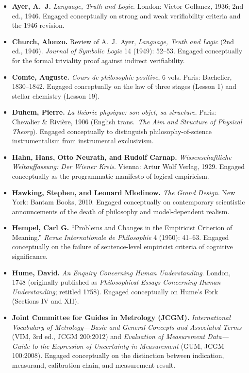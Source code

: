 \begin{itemize}
\item \textbf{Ayer, A.\ J.} \emph{Language, Truth and Logic}. London: Victor Gollancz, 1936; 2nd ed., 1946. Engaged conceptually on strong and weak verifiability criteria and the 1946 revision.
\item \textbf{Church, Alonzo.} Review of A.\ J.\ Ayer, \emph{Language, Truth and Logic} (2nd ed., 1946). \emph{Journal of Symbolic Logic} 14 (1949): 52--53. Engaged conceptually for the formal triviality proof against indirect verifiability.
\item \textbf{Comte, Auguste.} \emph{Cours de philosophie positive}, 6 vols. Paris: Bachelier, 1830--1842. Engaged conceptually on the law of three stages (Lesson 1) and stellar chemistry (Lesson 19).
\item \textbf{Duhem, Pierre.} \emph{La th\'eorie physique: son objet, sa structure}. Paris: Chevalier \& Rivi\`ere, 1906 (English trans.\ \emph{The Aim and Structure of Physical Theory}). Engaged conceptually to distinguish philosophy-of-science instrumentalism from instrumental exclusivism.
\item \textbf{Hahn, Hans, Otto Neurath, and Rudolf Carnap.} \emph{Wissenschaftliche Weltauffassung: Der Wiener Kreis}. Vienna: Artur Wolf Verlag, 1929. Engaged conceptually as the programmatic manifesto of logical empiricism.
\item \textbf{Hawking, Stephen, and Leonard Mlodinow.} \emph{The Grand Design}. New York: Bantam Books, 2010. Engaged conceptually on contemporary scientistic announcements of the death of philosophy and model-dependent realism.
\item \textbf{Hempel, Carl G.} ``Problems and Changes in the Empiricist Criterion of Meaning.'' \emph{Revue Internationale de Philosophie} 4 (1950): 41--63. Engaged conceptually on the failure of sentence-level empiricist criteria of cognitive significance.
\item \textbf{Hume, David.} \emph{An Enquiry Concerning Human Understanding}. London, 1748 (originally published as \emph{Philosophical Essays Concerning Human Understanding}; retitled 1758). Engaged conceptually on Hume's Fork (Sections IV and XII).
\item \textbf{Joint Committee for Guides in Metrology (JCGM).} \emph{International Vocabulary of Metrology---Basic and General Concepts and Associated Terms} (VIM, 3rd ed., JCGM 200:2012) and \emph{Evaluation of Measurement Data---Guide to the Expression of Uncertainty in Measurement} (GUM, JCGM 100:2008). Engaged conceptually on the distinction between indication, measurand, calibration chain, and measurement result.

\end{itemize}
